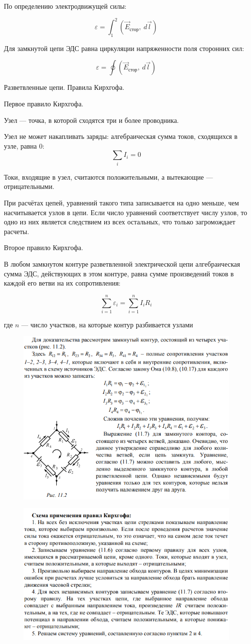 По определению электродвижущей силы:

$$
\varepsilon=\int_1^2(\vec E_{стор},\ d\vec l)
$$

Для замкнутой цепи ЭДС равна циркуляции напряженности поля сторонних сил:

$$
\varepsilon=\oint(\vec E_{стор},\ d\vec l)
$$

Разветвленные цепи. Правила Кирхгофа.

\begin{definition}
    Первое правило Кирхгофа.

    Узел — точка, в которой сходятся три и более проводника.
\end{definition}

Узел не может накапливать заряды: алгебраическая сумма токов, сходящихся в узле, равна 0:
$$
\sum_iI_i=0
$$

Токи, входящие в узел, считаются положительными, а вытекающие — отрицательными.

При расчётах цепей, уравнений такого типа записывается на одно меньше, чем насчитывается узлов в цепи. 
Если число уравнений соответствует числу узлов, то одно из них является следствием из всех остальных, что только загромождает расчеты. 

\begin{definition}
    Второе правило Кирхгофа.

    В любом замкнутом контуре разветвленной электрической цепи алгебраическая сумма ЭДС, действующих в этом контуре, равна сумме произведений токов в каждой его ветви на их сопротивления:

    $$
    \sum_{i=1}^n\varepsilon_i=\sum_{i=1}^nI_iR_i
    $$

    где $n$ — число участков, на которые контур разбивается узлами
\end{definition}

\begin{figure}[h]
    \centering
    \includegraphics[width=0.5\linewidth]{imgs/q33i1.png}
\end{figure}

\begin{figure}[h]
    \centering
    \includegraphics[width=0.5\linewidth]{imgs/q33i2.png}
\end{figure}